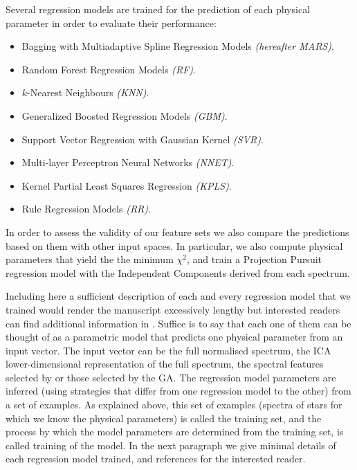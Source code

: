 Several regression models are trained for the prediction of each
physical parameter in order to evaluate their performance:

\begin{itemize}

\item {Bagging with Multiadaptive Spline Regression Models \emph{(hereafter MARS)}.}

\item {Random Forest Regression Models \emph{(RF)}.}

\item {$k$-Nearest Neighbours \emph{(KNN)}.}

\item {Generalized Boosted Regression Models \emph{(GBM)}.}

\item {Support Vector Regression with Gaussian Kernel \emph{(SVR)}.}

\item {Multi-layer Perceptron Neural Networks \emph{(NNET)}.}

\item {Kernel Partial Least Squares Regression \emph{(KPLS)}.}

\item {Rule Regression Models \emph{(RR)}.}

\end{itemize}

In order to assess the validity of our feature sets we also compare
the predictions based on them with other input spaces. In particular,
we also compute physical parameters that yield the the minimum
$\chi^2$, and train a Projection Pursuit regression model with the
Independent Components \citep{Hyvarinen:1998:NAD:302528.302606}
derived from each spectrum.

Including here a sufficient description of each and every regression
model that we trained would render the manuscript excessively lengthy
but interested readers can find additional information in
\cite{baraud2002model,geman1992neural,elith2008working,
meyer2003support,svetnik2003random}. 
Suffice is to say that each one of them can be thought of as
a parametric model that predicts one physical parameter from an input
vector. The input vector can be the full normalised spectrum, the ICA
lower-dimensional representation of the full spectrum, the spectral
features selected by \cite{cesetti} or those selected by the GA. The
regression model parameters are inferred (using strategies that differ
from one regression model to the other) from a set of examples. As
explained above, this set of examples (spectra of stars for which we
know the physical parameters) is called the training set, and the
process by which the model parameters are determined from the training
set, is called training of the model. In the next paragraph we give
minimal details of each regression model trained, and references for
the interested reader.

